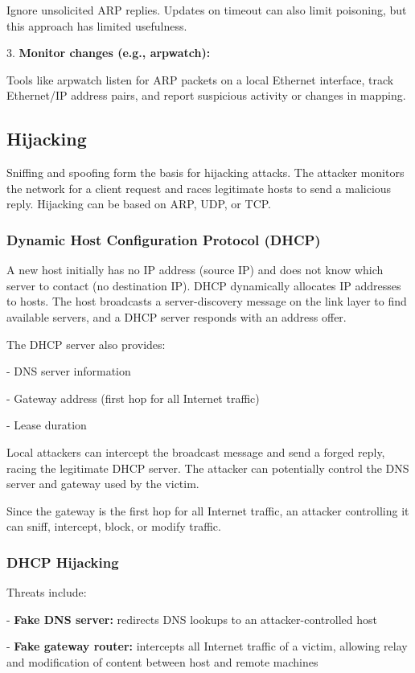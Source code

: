 Ignore unsolicited ARP replies. Updates on timeout can also limit poisoning, but this approach has limited usefulness.  

3. \textbf{Monitor changes (e.g., arpwatch):}  

Tools like arpwatch listen for ARP packets on a local Ethernet interface, track Ethernet/IP address pairs, and report suspicious activity or changes in mapping.  

\subsection{Hijacking}
Sniffing and spoofing form the basis for hijacking attacks. The attacker monitors the network for a client request and races legitimate hosts to send a malicious reply. Hijacking can be based on ARP, UDP, or TCP.  

\subsubsection{Dynamic Host Configuration Protocol (DHCP)}
A new host initially has no IP address (source IP) and does not know which server to contact (no destination IP). DHCP dynamically allocates IP addresses to hosts. The host broadcasts a server-discovery message on the link layer to find available servers, and a DHCP server responds with an address offer.  

The DHCP server also provides:

- DNS server information  

- Gateway address (first hop for all Internet traffic)  

- Lease duration  

Local attackers can intercept the broadcast message and send a forged reply, racing the legitimate DHCP server. The attacker can potentially control the DNS server and gateway used by the victim.  

Since the gateway is the first hop for all Internet traffic, an attacker controlling it can sniff, intercept, block, or modify traffic.  

\subsubsection{DHCP Hijacking}
Threats include:

- \textbf{Fake DNS server:} redirects DNS lookups to an attacker-controlled host  

- \textbf{Fake gateway router:} intercepts all Internet traffic of a victim, allowing relay and modification of content between host and remote machines  

